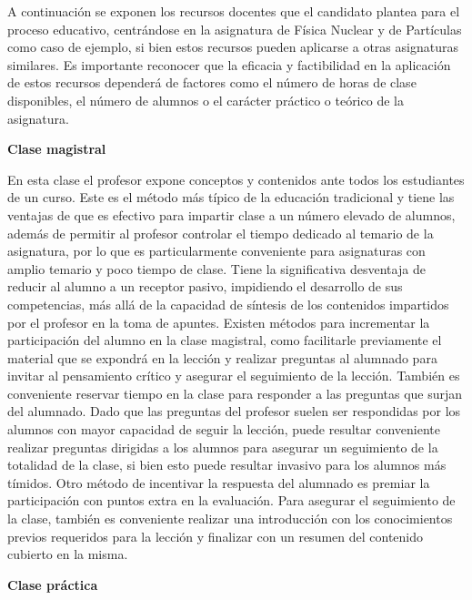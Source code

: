 \documentclass[a4paper,12pt,twoside]{article}
\begin{document}
A continuación se exponen los recursos docentes que el candidato plantea para el proceso educativo, centrándose en la asignatura de Física Nuclear y de Partículas como caso de ejemplo, si bien estos recursos pueden aplicarse a otras asignaturas similares. Es importante reconocer que la eficacia y factibilidad en la aplicación de estos recursos dependerá de factores como el número de horas de clase disponibles, el número de alumnos o el carácter práctico o teórico de la asignatura.

\textbf{Clase magistral} 

En esta clase el profesor expone conceptos y contenidos ante todos los estudiantes de un curso. Este es el método más típico de la educación tradicional y tiene las ventajas de que es efectivo para impartir clase a un número elevado de alumnos, además de permitir al profesor controlar el tiempo dedicado al temario de la asignatura, por lo que es particularmente conveniente para asignaturas con amplio temario y poco tiempo de clase. Tiene la significativa desventaja de reducir al alumno a un receptor pasivo, impidiendo el desarrollo de sus competencias, más allá de la capacidad de síntesis de los contenidos impartidos por el profesor en la toma de apuntes. Existen métodos para incrementar la participación del alumno en la clase magistral, como facilitarle previamente el material que se expondrá en la lección y realizar preguntas al alumnado para invitar al pensamiento crítico y asegurar el seguimiento de la lección. También es conveniente reservar tiempo en la clase para responder a las preguntas que surjan del alumnado. Dado que las preguntas del profesor suelen ser respondidas por los alumnos con mayor capacidad de seguir la lección, puede resultar conveniente realizar preguntas dirigidas a los alumnos para asegurar un seguimiento de la totalidad de la clase, si bien esto puede resultar invasivo para los alumnos más tímidos. Otro método de incentivar la respuesta del alumnado es premiar la participación con puntos extra en la evaluación. Para asegurar el seguimiento de la clase, también es conveniente realizar una introducción con los conocimientos previos requeridos para la lección y finalizar con un resumen del contenido cubierto en la misma.

\textbf{Clase práctica} 
\end{document}
